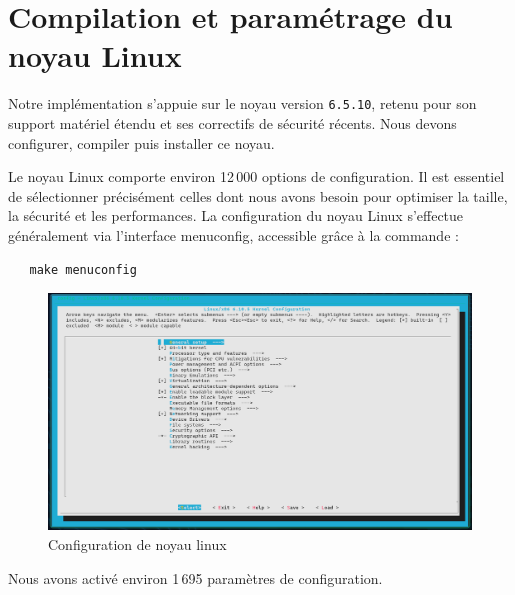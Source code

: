 

 


  


  

\section{Compilation et paramétrage du noyau Linux}
\label{subsec:compilation-noyau}

Notre implémentation s’appuie sur le noyau version \texttt{6.5.10}, retenu pour son support matériel étendu et ses correctifs de sécurité récents. Nous devons configurer, compiler puis installer ce noyau.

Le noyau Linux comporte environ 12 000 options de configuration. Il est essentiel de sélectionner précisément celles dont nous avons besoin pour optimiser la taille, la sécurité et les performances.
\clearpage
La configuration du noyau Linux s'effectue généralement via l'interface menuconfig, accessible grâce à la commande :\\
\begin{verbatim}
   make menuconfig
\end{verbatim}

\begin{figure}[H]
  \centering
  \includegraphics[width=1\textwidth]{images_pfe/kernelmenuconfig.png}
  \caption{Configuration de noyau linux}
  \label{fig:configuration de noyau}
\end{figure}
Nous avons activé environ 1 695 paramètres de configuration.

